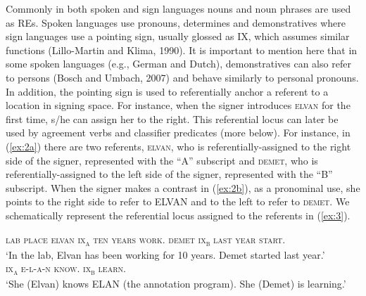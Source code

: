 \documentclass[]{elsarticle} %
\begin{document}
Commonly in both spoken and sign languages nouns and noun phrases are
used as REs. Spoken languages use pronouns, determines and
demonstratives where sign languages use a pointing sign, usually glossed
as IX, which assumes similar functions (Lillo-Martin and Klima, 1990).
It is important to mention here that in some spoken languages (e.g.,
German and Dutch), demonstratives can also refer to persons (Bosch and
Umbach, 2007) and behave similarly to personal pronouns. In addition,
the pointing sign is used to referentially anchor a referent to a
location in signing space. For instance, when the signer introduces
\textsc{elvan} for the first time, s/he can assign her to the right.
This referential locus can later be used by agreement verbs and
classifier predicates (more below). For instance, in (\ref{ex:2a}) there
are two referents, \textsc{elvan}, who is referentially-assigned to the
right side of the signer, represented with the ``A'' subscript and
\textsc{demet}, who is referentially-assigned to the left side of the
signer, represented with the ``B'' subscript. When the signer makes a
contrast in (\ref{ex:2b}), as a pronominal use, she points to the right
side to refer to ELVAN and to the left to refer to \textsc{demet}. We
schematically represent the referential locus assigned to the referents
in (\ref{ex:3}).

\begin{exe}
    \ex 
\begin{xlist}
    \ex \label{ex:2a}
    \textsc{lab place elvan ix\textsubscript{a} ten years work. demet ix\textsubscript{b} last year start.} \\
    ‘In the lab, Elvan has been working for 10 years. Demet started last year.’
    \\
    \ex \label{ex:2b}
    \textsc{ix\textsubscript{a} e-l-a-n know. ix\textsubscript{b} learn.}\\
    ‘She (Elvan) knows ELAN (the annotation program). She (Demet) is learning.’
    \end{xlist}
    \end{exe}
\end{document}
